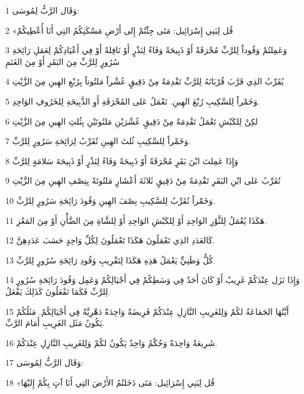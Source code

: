 \par 1 وَقَال الرَّبُّ لِمُوسَى:
\par 2 «قُل لِبَنِي إِسْرَائِيل: مَتَى جِئْتُمْ إِلى أَرْضِ مَسْكَنِكُمُ التِي أَنَا أُعْطِيكُمْ
\par 3 وَعَمِلتُمْ وَقُوداً لِلرَّبِّ مُحْرَقَةً أَوْ ذَبِيحَةً وَفَاءً لِنَذْرٍ أَوْ نَافِلةً أَوْ فِي أَعْيَادِكُمْ لِعَمَلِ رَائِحَةِ سُرُورٍ لِلرَّبِّ مِنَ البَقَرِ أَوْ مِنَ الغَنَمِ
\par 4 يُقَرِّبُ الذِي قَرَّبَ قُرْبَانَهُ لِلرَّبِّ تَقْدِمَةً مِنْ دَقِيقٍ عُشْراً مَلتُوتاً بِرُبْعِ الهِينِ مِنَ الزَّيْتِ
\par 5 وَخَمْراً لِلسَّكِيبِ رُبْعَ الهِينِ. تَعْمَلُ عَلى المُحْرَقَةِ أَوِ الذَّبِيحَةِ لِلخَرُوفِ الوَاحِدِ.
\par 6 لكِنْ لِلكَبْشِ تَعْمَلُ تَقْدِمَةً مِنْ دَقِيقٍ عُشْرَيْنِ مَلتُوتَيْنِ بِثُلثِ الهِينِ مِنَ الزَّيْتِ
\par 7 وَخَمْراً لِلسَّكِيبِ ثُلثَ الهِينِ تُقَرِّبُ لِرَائِحَةِ سَرُورٍ لِلرَّبِّ.
\par 8 وَإِذَا عَمِلتَ ابْنَ بَقَرٍ مُحْرَقَةً أَوْ ذَبِيحَةً وَفَاءً لِنَذْرٍ أَوْ ذَبِيحَةَ سَلامَةٍ لِلرَّبِّ
\par 9 تُقَرِّبُ عَلى ابْنِ البَقَرِ تَقْدِمَةً مِنْ دَقِيقٍ ثَلاثَةَ أَعْشَارٍ مَلتُوتَةً بِنِصْفِ الهِينِ مِنَ الزَّيْتِ
\par 10 وَخَمْراً تُقَرِّبُ لِلسَّكِيبِ نِصْفَ الهِينِ وَقُودَ رَائِحَةِ سَرُورٍ لِلرَّبِّ.
\par 11 هَكَذَا يُعْمَلُ لِلثَّوْرِ الوَاحِدِ أَوْ لِلكَبْشِ الوَاحِدِ أَوْ لِلشَّاةِ مِنَ الضَّأْنِ أَوْ مِنَ المَعْزِ.
\par 12 كَالعَدَدِ الذِي تَعْمَلُونَ هَكَذَا تَعْمَلُونَ لِكُلِّ وَاحِدٍ حَسَبَ عَدَدِهِنَّ.
\par 13 كُلُّ وَطَنِيٍّ يَعْمَلُ هَذِهِ هَكَذَا لِتَقْرِيبِ وَقُودِ رَائِحَةِ سُرُورٍ لِلرَّبِّ.
\par 14 وَإِذَا نَزَل عِنْدَكُمْ غَرِيبٌ أَوْ كَانَ أَحَدٌ فِي وَسَطِكُمْ فِي أَجْيَالِكُمْ وَعَمِل وَقُودَ رَائِحَةِ سُرُورٍ لِلرَّبِّ فَكَمَا تَفْعَلُونَ كَذَلِكَ يَفْعَلُ.
\par 15 أَيَّتُهَا الجَمَاعَةُ لكُمْ وَلِلغَرِيبِ النَّازِلِ عِنْدَكُمْ فَرِيضَةٌ وَاحِدَةٌ دَهْرِيَّةٌ فِي أَجْيَالِكُمْ. مَثَلُكُمْ يَكُونُ مَثَل الغَرِيبِ أَمَامَ الرَّبِّ.
\par 16 شَرِيعَةٌ وَاحِدَةٌ وَحُكْمٌ وَاحِدٌ يَكُونُ لكُمْ وَلِلغَرِيبِ النَّازِلِ عِنْدَكُمْ.
\par 17 وَقَال الرَّبُّ لِمُوسَى:
\par 18 «قُل لِبَنِي إِسْرَائِيل: مَتَى دَخَلتُمُ الأَرْضَ التِي أَنَا آتٍ بِكُمْ إِليْهَا
